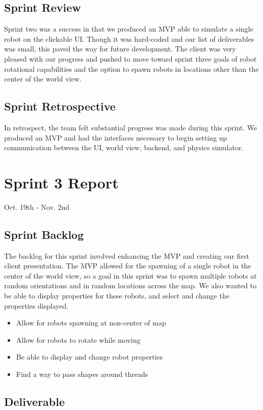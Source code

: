 \subsection{Sprint Review}

Sprint two was a success in that we produced an MVP able to simulate a single robot on the clickable UI. Though it was hard-coded and our list of deliverables was small, this paved the way for future development. The client was very pleased with our progress and pushed to move toward sprint three goals of robot rotational capabilities and the option to spawn robots in locations other than the center of the world view.

\subsection{Sprint Retrospective}

In retrospect, the team felt substantial progress was made during this sprint. We produced an MVP and had the interfaces necessary to begin setting up communication between the UI, world view, backend, and physics simulator.


\section{Sprint 3 Report}
Oct. 19th - Nov. 2nd
\subsection{Sprint Backlog}

The backlog for this sprint involved enhancing the MVP and creating our first client presentation. The MVP allowed for the spawning of a single robot in the center of the world view, so a goal in this sprint was to spawn multiple robots at random orientations and in random locations across the map. We also wanted to be able to display properties for these robots, and select and change the properties displayed.

\begin{itemize}
	\item Allow for robots spawning at non-center of map
	\item Allow for robots to rotate while moving
	\item Be able to display and change robot properties
	\item Find a way to pass shapes around threads
\end{itemize}

\subsection{Deliverable}

